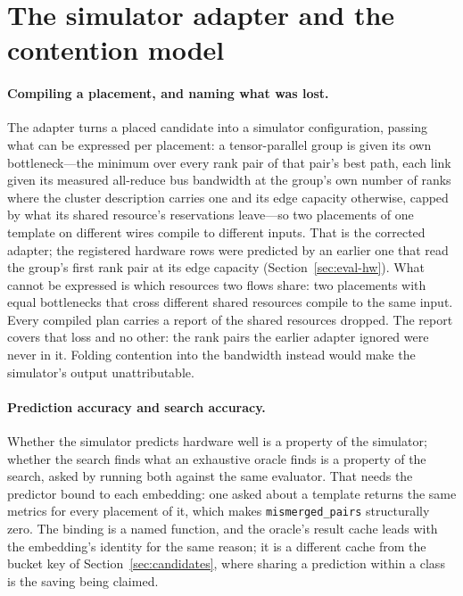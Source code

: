 \section{The simulator adapter and the contention model}
\label{sec:adapter}

\paragraph{Compiling a placement, and naming what was lost.}
The adapter turns a placed candidate into a simulator configuration, passing
what can be expressed per placement: a tensor-parallel group is given its own
bottleneck---the minimum over every rank pair of that pair's best path, each
link given its measured all-reduce bus bandwidth at the group's own number of
ranks where the cluster description carries one and its edge capacity
otherwise, capped by what its shared resource's reservations leave---so two
placements of one template on different wires compile to different inputs.
That is the corrected adapter; the registered hardware rows were predicted by
an earlier one that read the group's first rank pair at its edge capacity
(Section~\ref{sec:eval-hw}). What cannot be expressed is which resources two
flows share: two placements with equal bottlenecks that cross different shared
resources compile to the same input. Every compiled plan carries a report of
the shared resources dropped. The report covers that loss and no other: the
rank pairs the earlier adapter ignored were never in it. Folding contention
into the bandwidth instead would make the simulator's output unattributable.

\paragraph{Prediction accuracy and search accuracy.}
Whether the simulator predicts hardware well is a property of the simulator;
whether the search finds what an exhaustive oracle finds is a property of the
search, asked by running both against the same evaluator. That needs the
predictor bound to each embedding: one asked about a template returns the
same metrics for every placement of it, which makes \texttt{mismerged\_pairs}
structurally zero. The binding is a named function, and the oracle's result
cache leads with the embedding's identity for the same reason; it is a
different cache from the bucket key of Section~\ref{sec:candidates}, where
sharing a prediction within a class is the saving being claimed.

